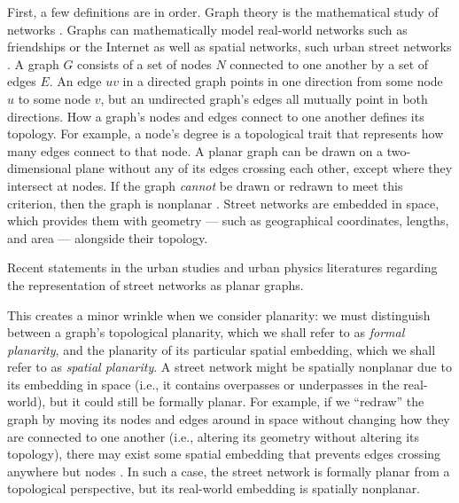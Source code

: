 \documentclass[Afour,sageh,times]{sagej}
\begin{document}
First, a few definitions are in order. Graph theory is the mathematical study of networks \citep{newman_networks:_2010}. Graphs can mathematically model real-world networks such as friendships or the Internet as well as spatial networks, such urban street networks \citep{barthelemy_spatial_2011}. A graph $G$ consists of a set of nodes $N$ connected to one another by a set of edges $E$. An edge $uv$ in a directed graph points in one direction from some node $u$ to some node $v$, but an undirected graph's edges all mutually point in both directions. How a graph's nodes and edges connect to one another defines its topology. For example, a node's degree is a topological trait that represents how many edges connect to that node. A planar graph can be drawn on a two-dimensional plane without any of its edges crossing each other, except where they intersect at nodes. If the graph \emph{cannot} be drawn or redrawn to meet this criterion, then the graph is nonplanar \citep{trudeau_introduction_1994}. Street networks are embedded in space, which provides them with geometry --- such as geographical coordinates, lengths, and area --- alongside their topology.

\begin{table}[htbp]
\centering
\caption{Recent statements in the urban studies and urban physics literatures regarding the representation of street networks as planar graphs.}
\label{tab:planar_quotes}

\end{table}

This creates a minor wrinkle when we consider planarity: we must distinguish between a graph's topological planarity, which we shall refer to as \emph{formal planarity}, and the planarity of its particular spatial embedding, which we shall refer to as \emph{spatial planarity}. A street network might be spatially nonplanar due to its embedding in space (i.e., it contains overpasses or underpasses in the real-world), but it could still be formally planar. For example, if we \enquote{redraw} the graph by moving its nodes and edges around in space without changing how they are connected to one another (i.e., altering its geometry without altering its topology), there may exist some spatial embedding that prevents edges crossing anywhere but nodes \citep[for a more comprehensive discussion see][pp.~6--10]{barthelemy_morphogenesis_2017}. In such a case, the street network is formally planar from a topological perspective, but its real-world embedding is spatially nonplanar.
\end{document}
